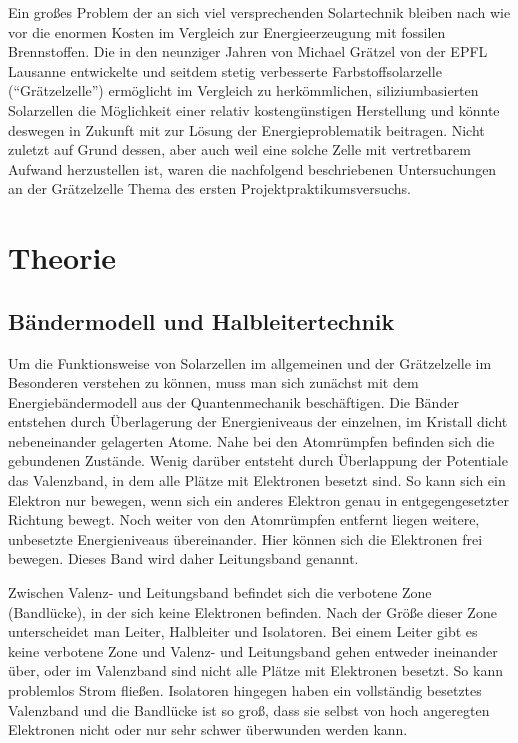 \documentclass[11pt]{scrartcl}
\begin{document}
Ein großes Problem der an sich viel versprechenden Solartechnik bleiben nach wie vor die enormen Kosten im Vergleich zur Energieerzeugung mit fossilen Brennstoffen. Die in den neunziger Jahren von Michael Grätzel von der EPFL Lausanne entwickelte und seitdem stetig verbesserte Farbstoff\-solarzelle ("`Grätzelzelle"') ermöglicht im Vergleich zu herkömmlichen, siliziumbasierten Solarzellen die Möglichkeit einer relativ kostengünstigen Herstellung und könnte deswegen in Zukunft mit zur Lösung der Energieproblematik beitragen. Nicht zuletzt auf Grund dessen, aber auch weil eine solche Zelle mit vertretbarem Aufwand herzustellen ist, waren die nachfolgend beschriebenen Untersuchungen an der Grätzelzelle Thema des ersten Projektpraktikumsversuchs.





\section{Theorie}
\subsection{B\"andermodell und Halbleitertechnik}
Um die Funktionsweise von Solarzellen im allgemeinen und der Gr\"atzelzelle im Besonderen verstehen zu k\"onnen, muss man sich zun\"achst mit dem Energieb\"andermodell aus der Quantenmechanik besch\"aftigen. Die B\"ander entstehen durch \"Uberlagerung der Energieniveaus der einzelnen, im Kristall dicht nebeneinander gelagerten Atome. Nahe bei den Atomr\"umpfen befinden sich die gebundenen Zust\"ande. Wenig dar\"uber entsteht durch \"Uberlappung der Potentiale das Valenzband, in dem alle Pl\"atze mit Elektronen besetzt sind. So kann sich ein Elektron nur bewegen, wenn sich ein anderes Elektron genau in entgegengesetzter Richtung bewegt. 
Noch weiter von den Atomr\"umpfen entfernt liegen weitere, unbesetzte Energieniveaus \"ubereinander. Hier k\"onnen sich die Elektronen frei bewegen. Dieses Band wird daher Leitungsband genannt.

Zwischen Valenz- und Leitungsband befindet sich die verbotene Zone (Bandl\"ucke), in der sich keine Elektronen befinden. Nach der Gr\"o\ss{}e dieser Zone unterscheidet man Leiter, Halbleiter und Isolatoren. Bei einem Leiter gibt es keine verbotene Zone und Valenz- und Leitungsband gehen entweder ineinander \"uber, oder im Valenzband sind nicht alle Pl\"atze mit Elektronen besetzt. So kann problemlos Strom fließen. Isolatoren hingegen haben ein vollst\"andig besetztes Valenzband und die Bandl\"ucke ist so gro\ss{}, dass sie selbst von hoch angeregten Elektronen nicht oder nur sehr schwer \"uberwunden werden kann.
\end{document}
